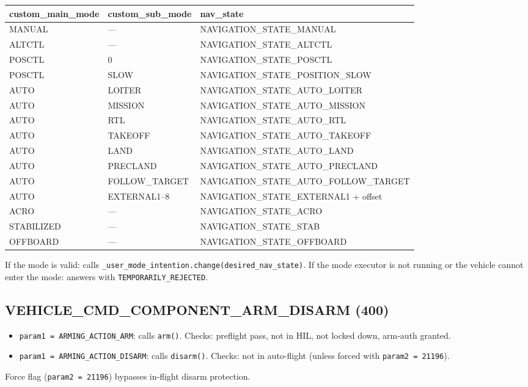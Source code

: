 \documentclass[12pt,a4paper]{article}
\begin{document}
\begin{center}\begin{tabular}{lll}\toprule
custom\_main\_mode & custom\_sub\_mode & nav\_state \\\midrule
MANUAL & --- & NAVIGATION\_STATE\_MANUAL \\
ALTCTL & --- & NAVIGATION\_STATE\_ALTCTL \\
POSCTL & 0 & NAVIGATION\_STATE\_POSCTL \\
POSCTL & SLOW & NAVIGATION\_STATE\_POSITION\_SLOW \\
AUTO & LOITER & NAVIGATION\_STATE\_AUTO\_LOITER \\
AUTO & MISSION & NAVIGATION\_STATE\_AUTO\_MISSION \\
AUTO & RTL & NAVIGATION\_STATE\_AUTO\_RTL \\
AUTO & TAKEOFF & NAVIGATION\_STATE\_AUTO\_TAKEOFF \\
AUTO & LAND & NAVIGATION\_STATE\_AUTO\_LAND \\
AUTO & PRECLAND & NAVIGATION\_STATE\_AUTO\_PRECLAND \\
AUTO & FOLLOW\_TARGET & NAVIGATION\_STATE\_AUTO\_FOLLOW\_TARGET \\
AUTO & EXTERNAL1--8 & NAVIGATION\_STATE\_EXTERNAL1 + offset \\
ACRO & --- & NAVIGATION\_STATE\_ACRO \\
STABILIZED & --- & NAVIGATION\_STATE\_STAB \\
OFFBOARD & --- & NAVIGATION\_STATE\_OFFBOARD \\
\bottomrule\end{tabular}\end{center}

If the mode is valid: calls \texttt{\_user\_mode\_intention.change(desired\_nav\_state)}.
If the mode executor is not running or the vehicle cannot enter the mode:
answers with \texttt{TEMPORARILY\_REJECTED}.

\subsection{VEHICLE\_CMD\_COMPONENT\_ARM\_DISARM (400)}

\begin{itemize}
  \item \texttt{param1 = ARMING\_ACTION\_ARM}: calls \texttt{arm()}.
        Checks: preflight pass, not in HIL, not locked down, arm-auth granted.
  \item \texttt{param1 = ARMING\_ACTION\_DISARM}: calls \texttt{disarm()}.
        Checks: not in auto-flight (unless forced with \texttt{param2 = 21196}).
\end{itemize}
Force flag (\texttt{param2 = 21196}) bypasses in-flight disarm protection.
\end{document}
